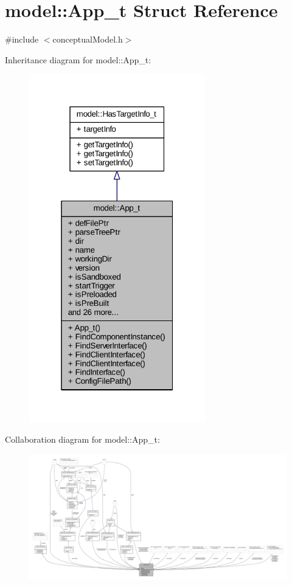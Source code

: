 \hypertarget{structmodel_1_1_app__t}{}\section{model\+:\+:App\+\_\+t Struct Reference}
\label{structmodel_1_1_app__t}


{\ttfamily \#include $<$conceptual\+Model.\+h$>$}



Inheritance diagram for model\+:\+:App\+\_\+t\+:
\nopagebreak
\begin{figure}[H]
\begin{center}
\leavevmode
\includegraphics[width=217pt]{structmodel_1_1_app__t__inherit__graph}
\end{center}
\end{figure}


Collaboration diagram for model\+:\+:App\+\_\+t\+:
\nopagebreak
\begin{figure}[H]
\begin{center}
\leavevmode
\includegraphics[width=350pt]{structmodel_1_1_app__t__coll__graph}
\end{center}
\end{figure}
